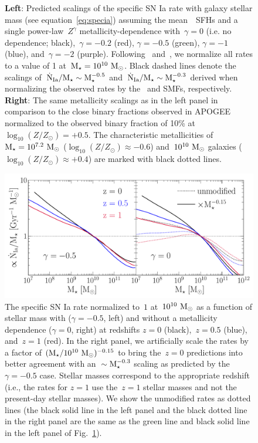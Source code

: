 \documentclass[ms.tex]{subfiles}
\begin{document}
\begin{figure}
\caption{
\textbf{Left}: Predicted scalings of the specific SN Ia rate with galaxy
stellar mass (see equation~\ref{eq:specia}) assuming the mean~\um~SFHs and a
single power-law~$Z^\gamma$ metallicity-dependence with~$\gamma = 0$ (i.e. no
dependence; black),~$\gamma = -0.2$ (red), $\gamma = -0.5$ (green),
$\gamma = -1$ (blue), and~$\gamma = -2$ (purple).
Following~\citet{Brown2019} and~\citet{Gandhi2022}, we normalize all rates to
a value of 1 at~$\text{M}_\star = 10^{10}~\text{M}_\odot$.
Black dashed lines denote the scalings of~$\dot{\text{N}}_\text{Ia} / \text{M}_\star
\sim \text{M}_\star^{-0.5}$ and~$\dot{\text{N}}_\text{Ia} / \text{M}_\star \sim \text{M}_\star^{-0.3}$
derived when normalizing the observed rates by the~\citet{Bell2003} and
\citet{Baldry2012} SMFs, respectively.
\textbf{Right}: The same metallicity scalings as in the left panel in
comparison to the close binary fractions observed in APOGEE
\citep[][black dashed line with error bars]{Moe2019} normalized to the observed
binary fraction of 10\% at~$\log_{10}(Z / Z_\odot) = +0.5$.
The characteristic metallicities of~$\text{M}_\star = 10^{7.2}~\text{M}_\odot$
($\log_{10}(Z / Z_\odot) \approx -0.6$) and~$10^{10}~\text{M}_\odot$ galaxies 
($\log_{10}(Z / Z_\odot) \approx +0.4$) are marked with black dotted lines.
}
\label{fig:specia_metdep}
\end{figure}

\begin{figure}
\centering
\includegraphics[scale = 0.65]{umachine_iarate_redshiftevol.pdf}
\caption{
The specific SN Ia rate normalized to~$1$ at~$10^{10}~\text{M}_\odot$ as a function of
stellar mass with ($\gamma = -0.5$, left) and without a metallicity dependence
($\gamma = 0$, right) at redshifts $z = 0$ (black),~$z = 0.5$ (blue),
and~$z = 1$ (red).
In the right panel, we artificially scale the rates by a factor of
$(\text{M}_\star / 10^{10}~\text{M}_\odot)^{-0.15}$ to bring the~$z = 0$ predictions into
better agreement with an~$\sim \text{M}_\star^{-0.3}$ scaling as predicted by the
$\gamma = -0.5$ case.
Stellar masses correspond to the appropriate redshift (i.e., the rates for
$z = 1$ use the~$z = 1$ stellar masses and not the present-day stellar
masses).
We show the unmodified rates as dotted lines (the black solid line in the left
panel and the black dotted line in the right panel are the same as the green
line and black solid line in the left panel of Fig.~\ref{fig:specia_metdep}).
}
\label{fig:specia_zdep}
\end{figure}
\end{document}
